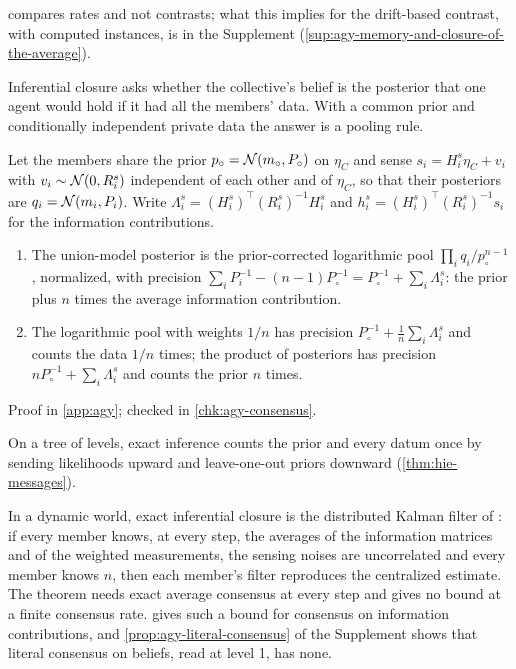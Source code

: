  compares rates and not contrasts; what this implies for the drift-based contrast, with computed instances, is in the Supplement (\cref{sup:agy-memory-and-closure-of-the-average}).

Inferential closure asks whether the collective's belief is the posterior that one agent would hold if it had all the members' data. With a common prior and conditionally independent private data the answer is a pooling rule.

\begin{proposition}[Pooling]\label{prop:agy-pooling}
Let the members share the prior $p_\circ=\mathcal{N}(m_\circ,P_\circ)$ on $\eta_C$ and sense $s_i=H^s_i\eta_C+v_i$ with $v_i\sim\mathcal{N}(0,R^s_i)$ independent of each other and of $\eta_C$, so that their posteriors are $q_i=\mathcal{N}(m_i,P_i)$. Write $\Lambda^s_i=(H^s_i)^\top(R^s_i)^{-1}H^s_i$ and $h^s_i=(H^s_i)^\top(R^s_i)^{-1}s_i$ for the information contributions.
\begin{enumerate}
\item[(a)] The union-model posterior is the prior-corrected logarithmic pool $\prod_iq_i/p_\circ^{n-1}$, normalized, with precision $\sum_iP_i^{-1}-(n-1)P_\circ^{-1}=P_\circ^{-1}+\sum_i\Lambda^s_i$: the prior plus $n$ times the average information contribution.
\item[(b)] The logarithmic pool with weights $1/n$ has precision $P_\circ^{-1}+\frac1n\sum_i\Lambda^s_i$ and counts the data $1/n$ times; the product of posteriors has precision $nP_\circ^{-1}+\sum_i\Lambda^s_i$ and counts the prior $n$ times.
\end{enumerate}
Proof in \cref{app:agy}; checked in \cref{chk:agy-consensus}.
\end{proposition}

On a tree of levels, exact inference counts the prior and every datum once by sending likelihoods upward and leave-one-out priors downward (\cref{thm:hie-messages}).

In a dynamic world, exact inferential closure is the distributed Kalman filter of \citet[Theorem~1]{olfatisaber2005distributed}: if every member knows, at every step, the averages of the information matrices and of the weighted measurements, the sensing noises are uncorrelated and every member knows $n$, then each member's filter reproduces the centralized estimate. The theorem needs exact average consensus at every step and gives no bound at a finite consensus rate.  gives such a bound for consensus on information contributions, and \cref{prop:agy-literal-consensus} of the Supplement shows that literal consensus on beliefs, read at level 1, has none.

